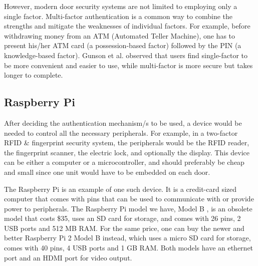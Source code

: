 However, modern door security systems are not limited to employing only a single factor. Multi-factor authentication is a common way to combine the strengths and mitigate the weaknesses of individual factors. For example, before withdrawing money from an ATM (Automated Teller Machine), one has to present his/her ATM card (a possession-based factor) followed by the PIN (a knowledge-based factor). Gunson et al. \cite{Gunson2011} observed that users find single-factor to be more convenient and easier to use, while multi-factor is more secure but takes longer to complete.

\subsection{Raspberry Pi}

After deciding the authentication mechanism/s to be used, a device would be needed to control all the necessary peripherals. For example, in a two-factor RFID \& fingerprint security system, the peripherals would be the RFID reader, the fingerprint scanner, the electric lock, and optionally the display. This device can be either a computer or a microcontroller, and should preferably be cheap and small since one unit would have to be embedded on each door.

The Raspberry Pi is an example of one such device. It is a credit-card sized computer that comes with pins that can be used to communicate with or provide power to peripherals. The Raspberry Pi model we have, Model B \cite{RPi1ModelB}, is an obsolete model that costs \$35, uses an SD card for storage, and comes with 26 pins, 2 USB ports and 512 MB RAM. For the same price, one can buy the newer and better Raspberry Pi 2 Model B \cite{RPi2ModelB} instead, which uses a micro SD card for storage, comes with 40 pins, 4 USB ports and 1 GB RAM. Both models have an ethernet port and an HDMI port for video output.